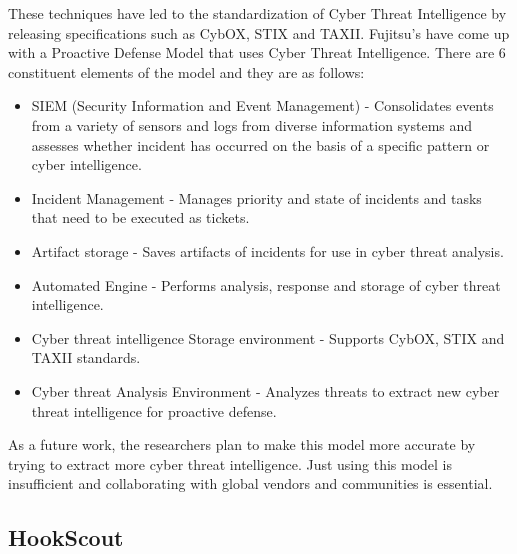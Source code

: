 \documentclass[11pt]{article}
\begin{document}
	These techniques have led to the standardization of Cyber Threat Intelligence by releasing specifications such as CybOX, STIX and TAXII. Fujitsu’s have come up with a Proactive Defense Model that uses Cyber Threat Intelligence. There are 6 constituent elements of the model and they are as follows:
	\begin{itemize}
		\item SIEM (Security Information and Event Management) - Consolidates events from a variety of sensors and logs from diverse information systems and assesses whether incident has occurred on the basis of a specific pattern or cyber intelligence.
		\item Incident Management - Manages priority and state of incidents and tasks that need to be executed as tickets.
		\item Artifact storage - Saves artifacts of incidents for use in cyber threat analysis.
		\item Automated Engine - Performs analysis, response and storage of cyber threat intelligence.
		\item Cyber threat intelligence Storage environment - Supports CybOX, STIX and TAXII standards.
		\item Cyber threat Analysis Environment - Analyzes threats to extract new cyber threat intelligence for proactive defense.
	\end{itemize}
	As a future work, the researchers plan to make this model more accurate by trying to extract more cyber threat intelligence. Just using this model is insufficient and collaborating with global vendors and communities is essential.
	
	\subsection{HookScout}
	
\end{document}
